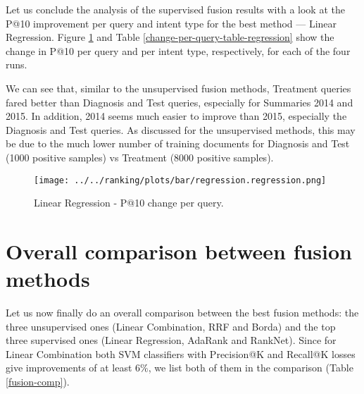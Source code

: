 Let us conclude the analysis of the supervised fusion results with a look at the P@10 improvement per query
and intent type
for the best method --- Linear Regression. Figure \ref{regression-query} and Table 
\ref{change-per-query-table-regression} show the change in P@10
per query and per intent type, respectively, for each of the four runs.

We can see that, similar to the unsupervised fusion methods,
Treatment queries fared better than Diagnosis and Test queries, especially for Summaries 2014 and 2015.
In addition, 2014 seems much easier to improve than 2015, especially the Diagnosis and Test queries.
As discussed for the unsupervised methods, this may be due to the much lower number of training
documents for Diagnosis and Test (1000 positive samples) vs Treatment (8000 positive samples).

\begin{table}[h!]
\centering
\caption{Linear Regression - Change in P@10 per intent type.}
\label{change-per-query-table-regression}
\end{table}

\begin{figure}[h!]
\centerline{
  \texttt{[image: ../../ranking/plots/bar/regression.regression.png]}
  }
  \caption{Linear Regression - P@10 change per query.}
  \label{regression-query}
\end{figure}

\section{Overall comparison between fusion methods}
Let us now finally do an overall comparison between the best fusion methods: 
the three unsupervised ones (Linear Combination, RRF and Borda)
and the top three supervised ones (Linear Regression, AdaRank and RankNet).
Since for Linear Combination both SVM classifiers with Precision@K and Recall@K
losses give improvements of at least $6\%$, we list both of them in the comparison
(Table \ref{fusion-comp}).

